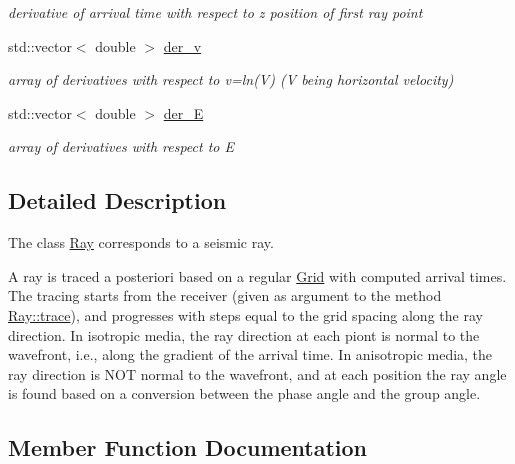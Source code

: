 \begin{DoxyCompactItemize}
\begin{DoxyCompactList}\small\item\em derivative of arrival time with respect to z position of first ray point \end{DoxyCompactList}\item 
\hypertarget{class_ray_a4ce9fa0820b71647b2f90b1ba01e21c1}{}std\+::vector$<$ double $>$ \hyperlink{class_ray_a4ce9fa0820b71647b2f90b1ba01e21c1}{der\+\_\+v}\label{class_ray_a4ce9fa0820b71647b2f90b1ba01e21c1}

\begin{DoxyCompactList}\small\item\em array of derivatives with respect to v=ln(\+V) (V being horizontal velocity) \end{DoxyCompactList}\item 
\hypertarget{class_ray_a46826c9e90b1b5296b9d854a1ab793ed}{}std\+::vector$<$ double $>$ \hyperlink{class_ray_a46826c9e90b1b5296b9d854a1ab793ed}{der\+\_\+\+E}\label{class_ray_a46826c9e90b1b5296b9d854a1ab793ed}

\begin{DoxyCompactList}\small\item\em array of derivatives with respect to E \end{DoxyCompactList}\end{DoxyCompactItemize}


\subsection{Detailed Description}
The class \hyperlink{class_ray}{Ray} corresponds to a seismic ray. 

A ray is traced a posteriori based on a regular \hyperlink{class_grid}{Grid} with computed arrival times. The tracing starts from the receiver (given as argument to the method \hyperlink{class_ray_ae0467e19b3cf83467dab708af0f8d5d6}{Ray\+::trace}), and progresses with steps equal to the grid spacing along the ray direction. In isotropic media, the ray direction at each piont is normal to the wavefront, i.\+e., along the gradient of the arrival time. In anisotropic media, the ray direction is N\+O\+T normal to the wavefront, and at each position the ray angle is found based on a conversion between the phase angle and the group angle. 

\subsection{Member Function Documentation}
\hypertarget{class_ray_a1133e78e15ac3cd0feb2bc67d1033b68}{}
